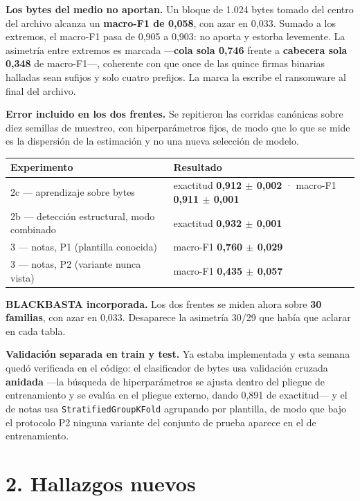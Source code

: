 \documentclass[11pt,a4paper]{article}
\begin{document}
\textbf{Los bytes del medio no aportan.} Un bloque de 1.024 bytes tomado del centro del
archivo alcanza un \textbf{macro-F1 de 0,058}, con azar en 0,033. Sumado a los extremos, el
macro-F1 pasa de 0,905 a 0,903: no aporta y estorba levemente. La asimetría entre extremos es
marcada ---\textbf{cola sola 0,746} frente a \textbf{cabecera sola 0,348} de macro-F1---,
coherente con que once de las quince firmas binarias halladas sean sufijos y solo cuatro
prefijos. La marca la escribe el ransomware al final del archivo.

\textbf{Error incluido en los dos frentes.} Se repitieron las corridas canónicas sobre diez
semillas de muestreo, con hiperparámetros fijos, de modo que lo que se mide es la dispersión de
la estimación y no una nueva selección de modelo.

\begin{center}
\small
\begin{tabular}{ll}
\toprule
\textbf{Experimento} & \textbf{Resultado} \\
\midrule
2c --- aprendizaje sobre bytes & exactitud \textbf{0,912 $\pm$ 0,002} · macro-F1 \textbf{0,911 $\pm$ 0,001} \\
2b --- detección estructural, modo combinado & exactitud \textbf{0,932 $\pm$ 0,001} \\
3 --- notas, P1 (plantilla conocida) & macro-F1 \textbf{0,760 $\pm$ 0,029} \\
3 --- notas, P2 (variante nunca vista) & macro-F1 \textbf{0,435 $\pm$ 0,057} \\
\bottomrule
\end{tabular}
\end{center}

\textbf{BLACKBASTA incorporada.} Los dos frentes se miden ahora sobre \textbf{30 familias},
con azar en 0,033. Desaparece la asimetría 30/29 que había que aclarar en cada tabla.

\textbf{Validación separada en train y test.} Ya estaba implementada y esta semana quedó
verificada en el código: el clasificador de bytes usa validación cruzada \textbf{anidada}
---la búsqueda de hiperparámetros se ajusta dentro del pliegue de entrenamiento y se evalúa en
el pliegue externo, dando 0,891 de exactitud--- y el de notas usa \texttt{StratifiedGroupKFold}
agrupando por plantilla, de modo que bajo el protocolo P2 ninguna variante del conjunto de
prueba aparece en el de entrenamiento.

\section*{2. Hallazgos nuevos}
\end{document}
